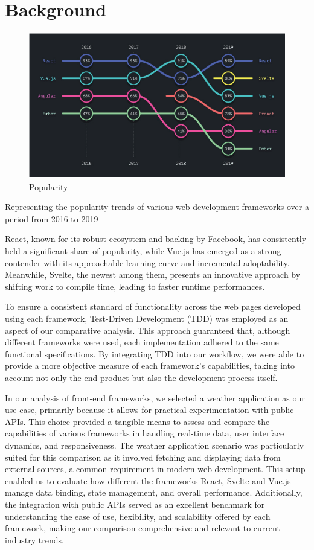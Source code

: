 \section{Background}

\begin{figure}[!htbp]
\centering
\includegraphics[width=\linewidth]{figs/popularity.png}
\caption{Popularity}
\label{fig:popularity}
\end{figure}

Representing the popularity trends of various web development frameworks over a period from 2016 to 2019

React, known for its robust ecosystem and backing by Facebook, has consistently held a significant share of popularity, while Vue.js has emerged as a strong contender with its approachable learning curve and incremental adoptability. Meanwhile, Svelte, the newest among them, presents an innovative approach by shifting work to compile time, leading to faster runtime performances.

To ensure a consistent standard of functionality across the web pages developed using each framework, Test-Driven Development (TDD) was employed as an aspect of our comparative analysis. This approach guaranteed that, although different frameworks were used, each implementation adhered to the same functional specifications. By integrating TDD into our workflow, we were able to provide a more objective measure of each framework's capabilities, taking into account not only the end product but also the development process itself.

In our analysis of front-end frameworks, we selected a weather application as our use case, primarily because it allows for practical experimentation with public APIs. This choice provided a tangible means to assess and compare the capabilities of various frameworks in handling real-time data, user interface dynamics, and responsiveness. The weather application scenario was particularly suited for this comparison as it involved fetching and displaying data from external sources, a common requirement in modern web development. This setup enabled us to evaluate how different the frameworks React, Svelte and Vue.js manage data binding, state management, and overall performance. Additionally, the integration with public APIs served as an excellent benchmark for understanding the ease of use, flexibility, and scalability offered by each framework, making our comparison comprehensive and relevant to current industry trends.

